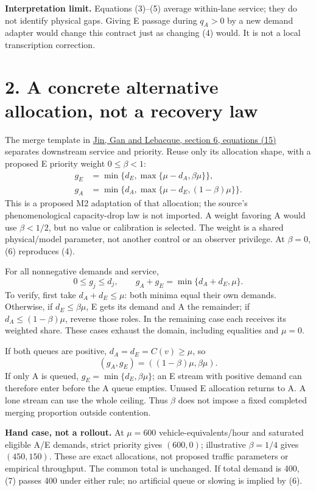 \documentclass[11pt,a4paper]{article}
\begin{document}
\textbf{Interpretation limit.} Equations (3)--(5) average within-lane
service; they do not identify physical gaps. Giving E passage during
$q_A>0$ by a new demand adapter would change this contract just as changing
(4) would. It is not a local transcription correction.

\newpage
\section*{2. A concrete alternative allocation, not a recovery law}

The merge template in
\href{https://arxiv.org/pdf/1310.2660}{Jin, Gan and Lebacque, section 6,
equations (15)} separates downstream service and priority. Reuse only its
allocation shape, with a proposed E priority weight $0\leq\beta<1$:
\begin{align}
 g_E&=\min\{d_E,\max\{\mu-d_A,\beta\mu\}\},\nonumber\\
 g_A&=\min\{d_A,\max\{\mu-d_E,(1-\beta)\mu\}\}. \tag{6}
\end{align}
This is a proposed M2 adaptation of that allocation; the source's
phenomenological capacity-drop law is not imported. A weight favoring A
would use $\beta<1/2$, but no value or calibration is selected. The weight
is a shared physical/model parameter, not another control or an observer
privilege. At $\beta=0$, (6) reproduces (4).

For all nonnegative demands and service,
\begin{equation}
 0\leq g_j\leq d_j,\qquad
 g_A+g_E=\min\{d_A+d_E,\mu\}. \tag{7}
\end{equation}
To verify, first take $d_A+d_E\leq\mu$: both minima equal their own
demands. Otherwise, if $d_E\leq\beta\mu$, E gets its demand and A the
remainder; if $d_A\leq(1-\beta)\mu$, reverse those roles. In the remaining
case each receives its weighted share. These cases exhaust the domain,
including equalities and $\mu=0$.

If both queues are positive, $d_A=d_E=C(v)\geq\mu$, so
\begin{equation}
 (g_A,g_E)=((1-\beta)\mu,\beta\mu). \tag{8}
\end{equation}
If only A is queued, $g_E=\min\{d_E,\beta\mu\}$; an E stream with positive
demand can therefore enter before the A queue empties. Unused E allocation
returns to A. A lone stream can use the whole ceiling. Thus $\beta$ does
not impose a fixed completed merging proportion outside contention.

\textbf{Hand case, not a rollout.} At $\mu=600$ vehicle-equivalents/hour
and saturated eligible A/E demands, strict priority gives $(600,0)$;
illustrative $\beta=1/4$ gives $(450,150)$. These are exact allocations,
not proposed traffic parameters or empirical throughput. The common total
is unchanged. If total demand is 400, (7) passes 400 under either rule;
no artificial queue or slowing is implied by (6).
\end{document}
